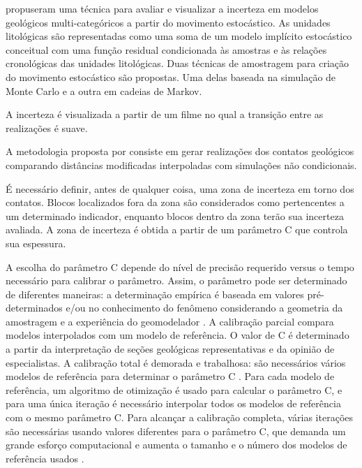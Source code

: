  propuseram uma técnica para avaliar e visualizar a incerteza em modelos geológicos multi-categóricos a partir do movimento estocástico. As unidades litológicas são representadas como uma soma de um modelo implícito estocástico conceitual com uma função residual condicionada às amostras e às relações cronológicas das unidades litológicas. Duas técnicas de amostragem para criação do movimento estocástico são propostas. Uma delas baseada na simulação de Monte Carlo e a outra em cadeias de Markov.

A incerteza é visualizada a partir de um filme no qual a transição entre as realizações é suave.

\label{boundsim}

A metodologia proposta por  consiste em gerar realizações dos contatos geológicos comparando distâncias modificadas interpoladas com simulações não condicionais. 

É necessário definir, antes de qualquer coisa, uma zona de incerteza em torno dos contatos. Blocos localizados fora da zona são considerados como pertencentes a um determinado indicador, enquanto blocos dentro da zona terão sua incerteza avaliada. A zona de incerteza é obtida a partir de um parâmetro C que controla sua espessura.

A escolha do parâmetro C depende do nível de precisão requerido versus o tempo necessário para calibrar o parâmetro. Assim, o parâmetro pode ser determinado de diferentes maneiras: a determinação empírica é baseada em valores pré-determinados e/ou no conhecimento do fenômeno considerando a geometria da amostragem e a experiência do geomodelador \cite{kaperov}. A calibração parcial compara modelos interpolados com um modelo de referência. O valor de C é determinado a partir da interpretação de seções geológicas representativas e da opinião de especialistas. A calibração total é demorada e trabalhosa: são necessários vários modelos de referência para determinar o parâmetro C \cite{kaperov}. Para cada modelo de referência, um algoritmo de otimização é usado para calcular o parâmetro C, e para uma única iteração é necessário interpolar todos os modelos de referência com o mesmo parâmetro C. Para alcançar a calibração completa, várias iterações são necessárias usando valores diferentes para o parâmetro C, que demanda um grande esforço computacional e aumenta o tamanho e o número dos modelos de referência usados \cite{munroe2008full}.

